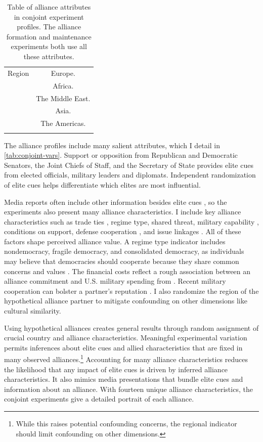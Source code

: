 \documentclass[12pt]{article}
\begin{document}
\begin{table}
\begin{adjustbox}{width = .99\textwidth}
\begin{tabular}{lc}
Region              & Europe. \\ 
                    & Africa. \\
                    & The Middle East. \\ 
                    & Asia. \\   
                    & The Americas. \\ 
                                                                            
\hline \\
\end{tabular}
\end{adjustbox}
\caption{Table of alliance attributes in conjoint experiment profiles. The alliance formation and maintenance experiments both use all these attributes.} 
\label{tab:conjoint-vars}
\end{table}


The alliance profiles include many salient attributes, which I detail in \autoref{tab:conjoint-vars}. 
Support or opposition from Republican and Democratic Senators, the Joint Chiefs of Staff, and the Secretary of State provides elite cues from elected officials, military leaders and diplomats. 
Independent randomization of elite cues helps differentiate which elites are most influential.


Media reports often include other information besides elite cues \citep{BaumPotter2008}, so the experiments also present many alliance characteristics. 
I include key alliance characteristics such as trade ties \citep{Fordham2010}, regime type, shared threat, military capability \citep{Johnsonetal2015}, conditions on support, defense cooperation \citep{Morrow1994, LeedsAnac2005}, and issue linkages \citep{Poast2012}.
All of these factors shape perceived alliance value. 
A regime type indicator includes nondemocracy, fragile democracy, and consolidated democracy, as individuals may believe that democracies should cooperate because they share common concerns and values \citep{Chuetal2021}. 
The financial costs reflect a rough association between an alliance commitment and U.S. military spending from \citet{AlleyFuhrmann2021}. 
Recent military cooperation can bolster a partner's reputation \citep{Crescenzietal2012, GannonKent2020}.
I also randomize the region of the hypothetical alliance partner to mitigate confounding on other dimensions like cultural similarity.


Using hypothetical alliances creates general results through random assignment of crucial country and alliance characteristics. 
Meaningful experimental variation permits inferences about elite cues and allied characteristics that are fixed in many observed alliances.\footnote{While this raises potential confounding concerns, the regional indicator should limit confounding on other dimensions.}
Accounting for many alliance characteristics reduces the likelihood that any impact of elite cues is driven by inferred alliance characteristics.
It also mimics media presentations that bundle elite cues and information about an alliance. 
With fourteen unique alliance characteristics, the conjoint experiments give a detailed portrait of each alliance.
\end{document}
